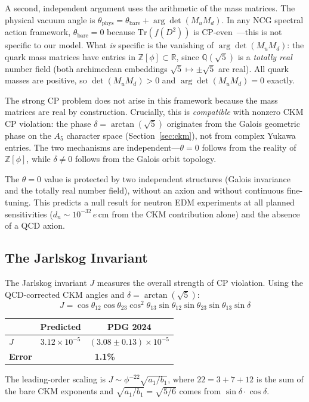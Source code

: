 \documentclass[12pt,a4paper]{article}
\theoremstyle{definition}
\begin{document}
A second, independent argument uses the arithmetic of the mass matrices.  The physical vacuum angle is $\theta_{\text{phys}} = \theta_{\text{bare}} + \arg\det(M_u M_d)$.  In any NCG spectral action framework, $\theta_{\text{bare}} = 0$ because $\mathrm{Tr}(f(D^2))$ is CP-even~\cite{chamseddine1997}---this is not specific to our model.  What \emph{is} specific is the vanishing of $\arg\det(M_u M_d)$: the quark mass matrices have entries in $\mathbb{Z}[\phi] \subset \mathbb{R}$, since $\mathbb{Q}(\sqrt{5})$ is a \emph{totally real} number field (both archimedean embeddings $\sqrt{5} \mapsto \pm\sqrt{5}$ are real).  All quark masses are positive, so $\det(M_u M_d) > 0$ and $\arg\det(M_u M_d) = 0$ exactly.

The strong CP problem does not arise in this framework because the mass matrices are real by construction.  Crucially, this is \emph{compatible} with nonzero CKM CP violation: the phase $\delta = \arctan(\sqrt{5})$ originates from the Galois geometric phase on the $A_5$ character space (Section~\ref{sec:ckm}), not from complex Yukawa entries.  The two mechanisms are independent---$\theta = 0$ follows from the reality of $\mathbb{Z}[\phi]$, while $\delta \neq 0$ follows from the Galois orbit topology.

The $\theta = 0$ value is protected by two independent structures (Galois invariance and the totally real number field), without an axion and without continuous fine-tuning.  This predicts a null result for neutron EDM experiments at all planned sensitivities ($d_n \sim 10^{-32}\,e\,\text{cm}$ from the CKM contribution alone) and the absence of a QCD axion.

\subsection{The Jarlskog Invariant}

The Jarlskog invariant $J$ measures the overall strength of CP violation. Using the QCD-corrected CKM angles and $\delta = \arctan(\sqrt{5})$:
\begin{equation}
J = \cos\theta_{12}\cos\theta_{23}\cos^2\theta_{13}\sin\theta_{12}\sin\theta_{23}\sin\theta_{13}\sin\delta
\end{equation}
\begin{center}
\begin{tabular}{lcc}
\toprule
& \textbf{Predicted} & \textbf{PDG 2024} \\
\midrule
$J$ & $3.12 \times 10^{-5}$ & $(3.08 \pm 0.13) \times 10^{-5}$ \\
\textbf{Error} & \multicolumn{2}{c}{\textbf{1.1\%}} \\
\bottomrule
\end{tabular}
\end{center}
The leading-order scaling is $J \sim \phi^{-22} \sqrt{a_1/b_1}$, where $22 = 3 + 7 + 12$ is the sum of the bare CKM exponents and $\sqrt{a_1/b_1} = \sqrt{5/6}$ comes from $\sin\delta \cdot \cos\delta$.
\end{document}
